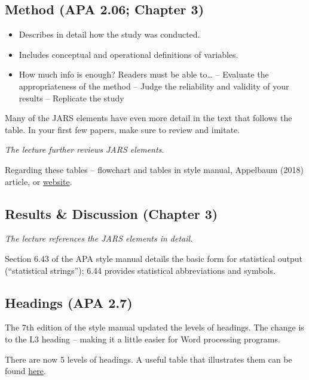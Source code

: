 \documentclass[
  11pt,
]{book}
\providecommand{\tightlist}{%
  \setlength{\itemsep}{0pt}\setlength{\parskip}{0pt}}
\begin{document}
\hypertarget{method-apa-2.06-chapter-3}{%
\subsection{Method (APA 2.06; Chapter 3)}\label{method-apa-2.06-chapter-3}}

\begin{itemize}
\tightlist
\item
  Describes in detail how the study was conducted.
\item
  Includes conceptual and operational definitions of variables.
\item
  How much info is enough? Readers must be able to\ldots{}
  -- Evaluate the appropriateness of the method
  -- Judge the reliability and validity of your results
  -- Replicate the study
\end{itemize}

Many of the JARS elements have even more detail in the text that follows the table. In your first few papers, make sure to review and imitate.

\emph{The lecture further reviews JARS elements.}

Regarding these tables -- flowchart and tables in style manual, Appelbaum (2018) article, or \href{https://apastyle.apa.org/jars/jars-quant-decision-flowchart.pdf}{website}.

\hypertarget{results-discussion-chapter-3}{%
\subsection{Results \& Discussion (Chapter 3)}\label{results-discussion-chapter-3}}

\emph{The lecture references the JARS elements in detail.}

Section 6.43 of the APA style manual details the basic form for statistical output (``statistical strings''); 6.44 provides statistical abbreviations and symbols.

\hypertarget{headings-apa-2.7}{%
\subsection{Headings (APA 2.7)}\label{headings-apa-2.7}}

The 7th edition of the style manual updated the levels of headings. The change is to the L3 heading -- making it a little easier for Word processing programs.

There are now 5 levels of headings. A useful table that illustrates them can be found \href{https://apastyle.apa.org/style-grammar-guidelines/paper-format/headings}{here}.
\end{document}
